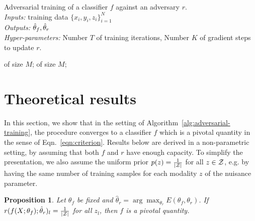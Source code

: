 \documentclass{article}
\theoremstyle{plain}
\newtheorem{proposition}[theorem]{Proposition}
\begin{document}
\begin{algorithm}
\caption{Adversarial training of a classifier $f$ against an adversary $r$.\\
{\it Inputs:} training data $\{ x_i, y_i, z_i \}_{i=1}^N$\\
{\it Outputs:} $\smash{\hat\theta_f}, \smash{\hat\theta_r}$\\
{\it Hyper-parameters:} Number $T$ of training iterations, Number $K$ of gradient steps to update $r$.}
\label{alg:adversarial-training}
\begin{algorithmic}[1]
         
             of size $M$;
        \EndFor
         of size $M$; 
    \EndFor
\end{algorithmic}
\end{algorithm}


\section{Theoretical results}

In this section, we show that in the setting of
Algorithm~\ref{alg:adversarial-training}, the procedure converges to a
classifier $f$ which is a pivotal quantity in the sense of
Eqn.~\ref{eqn:criterion}. Results below are derived in a non-parametric setting,
by assuming that both $f$ and $r$ have enough capacity. To simplify the
presentation, we also assume the uniform prior $p(z) =
\frac{1}{|{\cal Z}|}$ for all $z \in {\cal Z}$, e.g. by having the same
number of training samples for each modality $z$ of the nuisance
parameter.


\begin{proposition}

Let $\theta_f$ be fixed and $\hat\theta_r = \arg \max_{\theta_r} E(\theta_f,
\theta_r)$. If $r(f(X;\theta_f) ; \hat\theta_r )_l = \frac{1}{|{\cal Z}|}$
for all $z_l$, then $f$ is a pivotal quantity.

\end{proposition}
\end{document}
